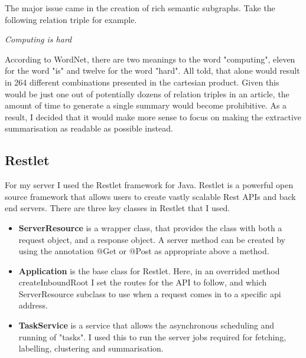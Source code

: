 \documentclass[12pt]{article}
\begin{document}
The major issue came in the creation of rich semantic subgraphs. Take the following relation triple for example.\\

\begin{displayquote}\emph{
Computing is hard\\}
\end{displayquote}

According to WordNet, there are two meanings to the word "computing", eleven for the word "is" and twelve for the word "hard". All told, that alone would result in 264 different combinations presented in the cartesian product. Given this would be just one out of potentially dozens of relation triples in an article, the amount of time to generate a single summary would become prohibitive. As a result, I decided that it would make more sense to focus on making the extractive summarisation as readable as possible instead. 

\subsection{Restlet}

\label{Restlet}

For my server I used the Restlet framework for Java. Restlet is a powerful open source framework that allows users to create vastly scalable Rest APIs and back end servers. There are three key classes in Restlet that I used.\\

\begin{itemize}
	\item \textbf{ServerResource} is a wrapper class, that provides the class with both a request object, and a response object. A server method can be created by using the annotation @Get or @Post as appropriate above a method. \\
	\item \textbf{Application} is the base class for Restlet. Here, in an overrided method createInboundRoot I set the routes for the API to follow, and which ServerResource subclass to use when a request comes in to a specific api address. \\
	\item \textbf{TaskService} is a service that allows the asynchronous scheduling and running of "tasks". I used this to run the server jobs required for fetching, labelling, clustering and summarisation. \\
\end{itemize}
\end{document}
